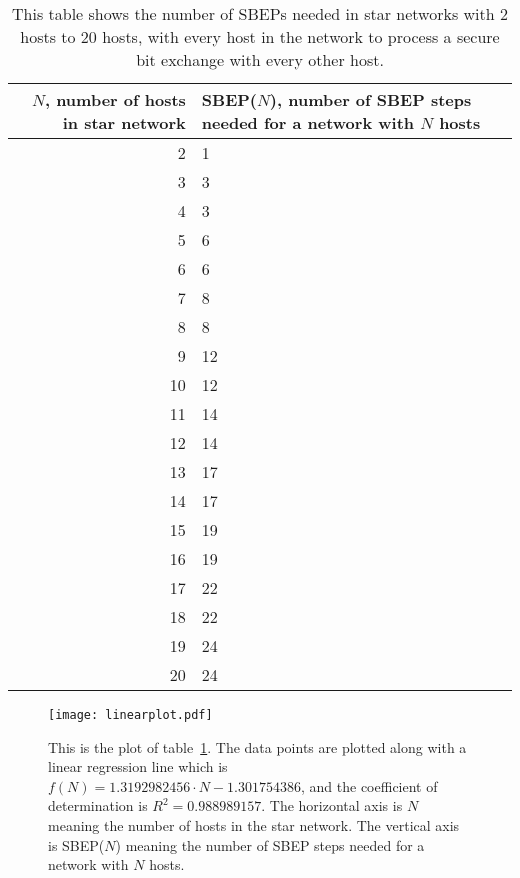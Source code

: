 \documentclass[a4paper,12pt,pdftex]{article}
\begin{document}
\begin{table}[H]
  \begin{center}
    \begin{tabular}{| r | p{6cm} |}
    \hline
    $N$, number of hosts in star network & SBEP($N$), number of SBEP steps needed for a network with $N$ hosts\\
    \hline
2 & 1 \\
    3 & 3\\
    4 & 3 \\
    5 & 6 \\
    6 & 6 \\
    7 & 8 \\
    8 & 8 \\
    9 & 12 \\
    10 & 12 \\
    11 & 14 \\
    12 & 14 \\
    13 & 17 \\
    14 & 17 \\
    15 & 19 \\
    16 & 19 \\
    17 & 22 \\
    18 & 22 \\
    19 & 24 \\
    20 & 24 \\     
    \hline
    \end{tabular}
  \end{center}
  \caption{This table shows the number of SBEPs needed in star networks with 2 hosts to 20 hosts, with every host in the network to process a secure bit exchange with every other host.}
  \label{table:ab}
\end{table}

\begin{figure}[H]
    \caption{This is the plot of table~\ref{table:ab}. The data points are plotted along with a linear regression line which is $f(N)=1.3192982456 \cdot N - 1.301754386$, and the coefficient of determination is $R^{2} = 0.988989157$. The horizontal axis is $N$ meaning the number of hosts in the star network. The vertical axis is SBEP($N$) meaning the number of SBEP steps needed for a network with $N$ hosts.}
    \label{fig:linearplot}
  \centering
\texttt{[image: linearplot.pdf]}
\end{figure}
\end{document}
